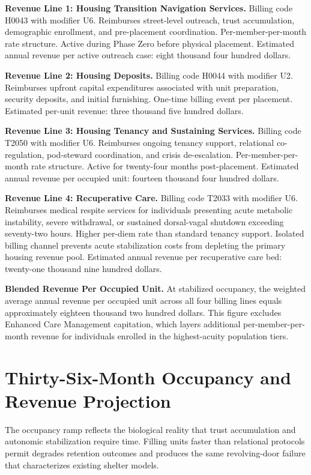 \documentclass[12pt, letterpaper]{article}
\begin{document}
\textbf{Revenue Line 1: Housing Transition Navigation Services.} Billing code H0043 with modifier U6. Reimburses street-level outreach, trust accumulation, demographic enrollment, and pre-placement coordination. Per-member-per-month rate structure. Active during Phase Zero before physical placement. Estimated annual revenue per active outreach case: eight thousand four hundred dollars.

\textbf{Revenue Line 2: Housing Deposits.} Billing code H0044 with modifier U2. Reimburses upfront capital expenditures associated with unit preparation, security deposits, and initial furnishing. One-time billing event per placement. Estimated per-unit revenue: three thousand five hundred dollars.

\textbf{Revenue Line 3: Housing Tenancy and Sustaining Services.} Billing code T2050 with modifier U6. Reimburses ongoing tenancy support, relational co-regulation, pod-steward coordination, and crisis de-escalation. Per-member-per-month rate structure. Active for twenty-four months post-placement. Estimated annual revenue per occupied unit: fourteen thousand four hundred dollars.

\textbf{Revenue Line 4: Recuperative Care.} Billing code T2033 with modifier U6. Reimburses medical respite services for individuals presenting acute metabolic instability, severe withdrawal, or sustained dorsal-vagal shutdown exceeding seventy-two hours. Higher per-diem rate than standard tenancy support. Isolated billing channel prevents acute stabilization costs from depleting the primary housing revenue pool. Estimated annual revenue per recuperative care bed: twenty-one thousand nine hundred dollars.

\textbf{Blended Revenue Per Occupied Unit.} At stabilized occupancy, the weighted average annual revenue per occupied unit across all four billing lines equals approximately eighteen thousand two hundred dollars. This figure excludes Enhanced Care Management capitation, which layers additional per-member-per-month revenue for individuals enrolled in the highest-acuity population tiers.

\clearpage
\section{Thirty-Six-Month Occupancy and Revenue Projection}

The occupancy ramp reflects the biological reality that trust accumulation and autonomic stabilization require time. Filling units faster than relational protocols permit degrades retention outcomes and produces the same revolving-door failure that characterizes existing shelter models.
\end{document}

